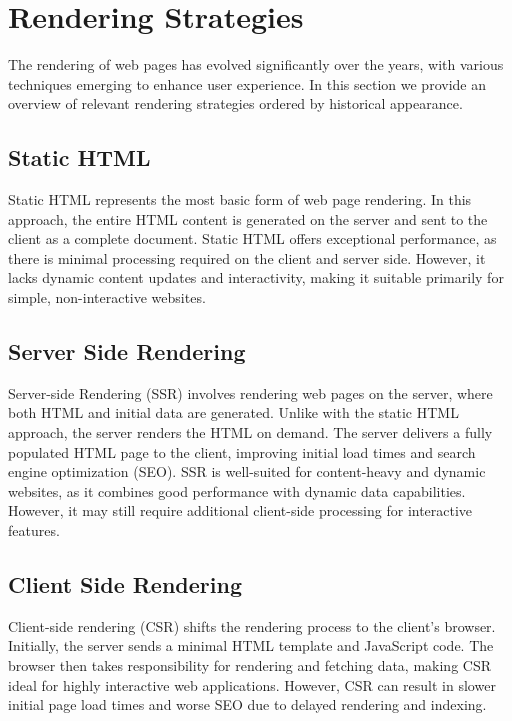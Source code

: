 \section{Rendering Strategies}
\label{sec:rendering-patterns}
The rendering of web pages has evolved significantly over the years, with various techniques emerging to enhance user experience. In this section we provide an overview of relevant rendering strategies ordered by historical appearance.

\subsection{Static HTML}
Static HTML represents the most basic form of web page rendering. In this approach, the entire HTML content is generated on the server and sent to the client as a complete document. Static HTML offers exceptional performance, as there is minimal processing required on the client and server side. However, it lacks dynamic content updates and interactivity, making it suitable primarily for simple, non-interactive websites.

\subsection{Server Side Rendering}
Server-side Rendering (SSR) involves rendering web pages on the server, where both HTML and initial data are generated. Unlike with the static HTML approach, the server renders the HTML on demand. The server delivers a fully populated HTML page to the client, improving initial load times and search engine optimization (SEO). SSR is well-suited for content-heavy and dynamic websites, as it combines good performance with dynamic data capabilities. However, it may still require additional client-side processing for interactive features.

\subsection{Client Side Rendering}
Client-side rendering (CSR) shifts the rendering process to the client's browser. Initially, the server sends a minimal HTML template and JavaScript code. The browser then takes responsibility for rendering and fetching data, making CSR ideal for highly interactive web applications. However, CSR can result in slower initial page load times and worse SEO due to delayed rendering and indexing.

